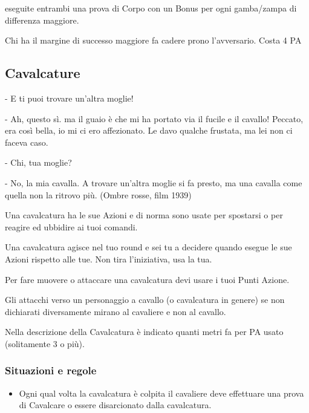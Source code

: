 \documentclass[12pt,a4paper,twoside,openany]{book}
\begin{document}
\begin{multicols}{2}
eseguite entrambi una prova di Corpo con un Bonus per ogni gamba/zampa di differenza maggiore.

Chi ha il margine di successo maggiore fa cadere prono l'avversario. Costa 4 PA


\subsection{Cavalcature}\label{cavalcature}

\begin{changemargin}{0.3cm}{0.3cm}\begin{enfasi}{
	- E ti puoi trovare un'altra moglie!
	
	- Ah, questo sì. ma il guaio è che mi ha portato via il fucile e il cavallo! Peccato, era così bella, io mi ci ero affezionato. Le davo qualche frustata, ma lei non ci faceva caso.
	
	- Chi, tua moglie?
	
	- No, la mia cavalla. A trovare un'altra moglie si fa presto, ma una cavalla come quella non la ritrovo più. (Ombre rosse, film 1939)}\end{enfasi}\end{changemargin}\medskip

Una cavalcatura ha le sue Azioni e di norma sono usate per spostarsi o per reagire ed ubbidire ai tuoi comandi.

Una cavalcatura agisce nel tuo round e sei tu a decidere quando esegue le sue Azioni rispetto alle tue. Non tira l'iniziativa, usa la tua.

Per fare muovere o attaccare una cavalcatura devi usare i tuoi Punti Azione.

Gli attacchi verso un personaggio a cavallo (o cavalcatura in genere) se non dichiarati diversamente mirano al cavaliere e non al cavallo.

Nella descrizione della Cavalcatura è indicato quanti metri fa per PA usato (solitamente 3 o più).

\subsubsection{Situazioni e regole}\label{cavallosituazioniregole}

\begin{itemize}
\item
Ogni qual volta la cavalcatura è colpita il cavaliere deve effettuare una prova di Cavalcare o essere disarcionato dalla cavalcatura.


\end{itemize}
\end{multicols}
\end{document}
